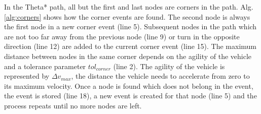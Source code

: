 In the Theta* path, all but the first and last nodes are corners in the path. Alg. \ref{alg:corners} shows how the corner events are found. The second node is always the first node in a new corner event (line 5). Subsequent nodes in the path which are not too far away from the previous node (line 9) or turn in the opposite direction (line 12) are added to the current corner event (line 15). The maximum distance between nodes in the same corner depends on the agility of the vehicle and a tolerance parameter $tol_{corner}$ (line 2). The agility of the vehicle is represented by $\Delta v_{max}$, the distance the vehicle needs to accelerate from zero to its maximum velocity. Once a node is found which does not belong in the event, the event is stored (line 18), a new event is created for that node (line 5) and the process repeats until no more nodes are left.
